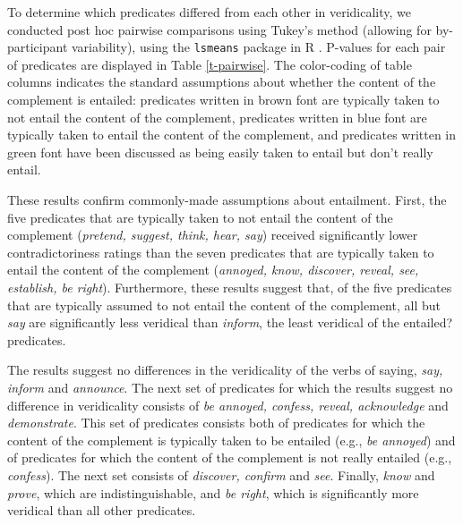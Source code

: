 \documentclass[11pt,fleqn]{article}
\newcommand{\6}{\mbox{$[\hspace*{-.6mm}[$}}
\newcommand{\9}{\mbox{$]\hspace*{-.6mm}]$}}
\begin{document}
\newpage

To determine which predicates differed from each other in veridicality, we conducted post hoc pairwise comparisons using Tukey's method (allowing for by-participant variability), using the \verb|lsmeans| package \citep{tukey} in R \citep{r}. P-values for each pair of predicates are displayed in Table \ref{t-pairwise}. The color-coding of table columns indicates the standard assumptions about whether the content of the complement is entailed: predicates written in brown font are typically taken to not entail the content of the complement, predicates written in blue font are typically taken to entail the content of the complement, and predicates written in green font have been discussed as being easily taken to entail but don't really entail.

These results confirm commonly-made assumptions about entailment. First, the five predicates that are typically taken to not entail the content of the complement ({\em pretend, suggest, think, hear, say}) received significantly lower contradictoriness ratings than the seven predicates that are typically taken to entail the content of the complement ({\em annoyed, know, discover, reveal, see, establish, be right}). Furthermore, these results suggest that, of the five predicates that are typically assumed to not entail the content of the complement, all but {\em say} are significantly less veridical than {\em inform}, the least veridical of the entailed? predicates.

The results suggest no differences in the veridicality of the verbs of saying, {\em say, inform} and {\em announce}. The next set of predicates for which the results suggest no difference in veridicality consists of {\em be annoyed, confess, reveal, acknowledge} and {\em demonstrate}. This set of predicates consists both of predicates for which the content of the complement is typically taken to be entailed (e.g., {\em be annoyed}) and of predicates for which the content of the complement is not really entailed (e.g., {\em confess}). The next set consists of {\em discover, confirm} and {\em see}. Finally, {\em know} and {\em prove}, which are indistinguishable, and {\em be right}, which is significantly more veridical than all other predicates.
\end{document}
